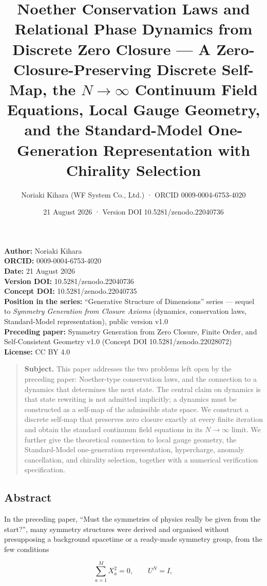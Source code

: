 \documentclass[
  a4paper,
]{article}
\title{Noether Conservation Laws and Relational Phase Dynamics from
Discrete Zero Closure --- A Zero-Closure-Preserving Discrete Self-Map,
the \(N\to\infty\) Continuum Field Equations, Local Gauge Geometry, and
the Standard-Model One-Generation Representation with Chirality
Selection}
\author{Noriaki Kihara (WF System Co., Ltd.) · ORCID
0009-0004-6753-4020}
\date{21 August 2026 · Version DOI 10.5281/zenodo.22040736}
\begin{document}
\maketitle

\textbf{Author:} Noriaki Kihara\\
\textbf{ORCID:} 0009-0004-6753-4020\\
\textbf{Date:} 21 August 2026\\
\textbf{Version DOI:} 10.5281/zenodo.22040736\\
\textbf{Concept DOI:} 10.5281/zenodo.22040735\\
\textbf{Position in the series:} ``Generative Structure of Dimensions''
series --- sequel to \emph{Symmetry Generation from Closure Axioms}
(dynamics, conservation laws, Standard-Model representation), public
version v1.0\\
\textbf{Preceding paper:} Symmetry Generation from Zero Closure, Finite
Order, and Self-Consistent Geometry v1.0 (Concept DOI
10.5281/zenodo.22028072)\\
\textbf{License:} CC BY 4.0

\begin{quote}
\textbf{Subject.} This paper addresses the two problems left open by the
preceding paper: Noether-type conservation laws, and the connection to a
dynamics that determines the next state. The central claim on dynamics
is that state rewriting is not admitted implicitly; a dynamics must be
constructed as a self-map of the admissible state space. We construct a
discrete self-map that preserves zero closure exactly at every finite
iteration and obtain the standard continuum field equations in its
\(N\to\infty\) limit. We further give the theoretical connection to
local gauge geometry, the Standard-Model one-generation representation,
hypercharge, anomaly cancellation, and chirality selection, together
with a numerical verification specification.
\end{quote}

\subsection{Abstract}\label{abstract}

In the preceding paper, ``Must the symmetries of physics really be given
from the start?'', many symmetry structures were derived and organised
without presupposing a background spacetime or a ready-made symmetry
group, from the few conditions

\[
\sum_{a=1}^{M}X_a^2=0,
\qquad
U^N=I,
\]
\end{document}
